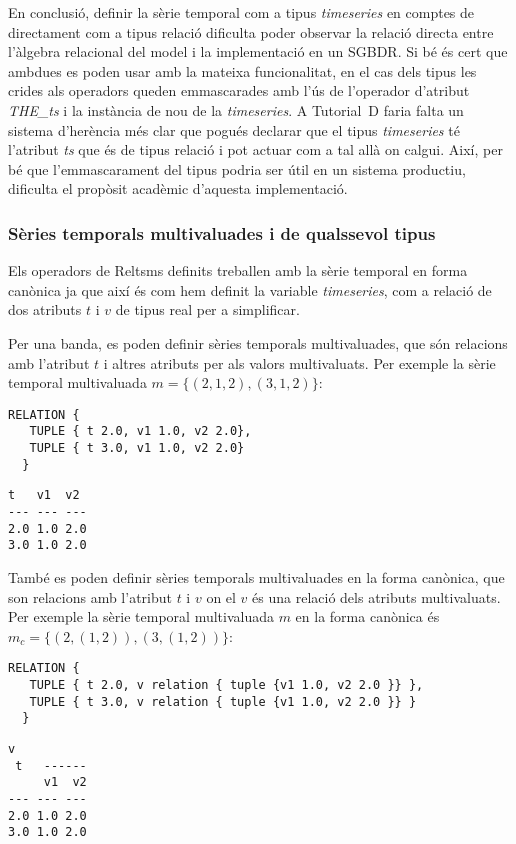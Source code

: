 {En conclusió, definir la sèrie temporal com a tipus \emph{timeseries}
en comptes de directament com a tipus relació dificulta poder observar
la relació directa entre l'àlgebra relacional del model i la
implementació en un \gls{SGBDR}. Si bé és cert que ambdues es poden
usar amb la mateixa funcionalitat, en el cas dels tipus les crides als
operadors queden emmascarades amb l'ús de l'operador d'atribut
\emph{THE\_ts} i la instància de nou de la \emph{timeseries}.  A
Tutorial~D faria falta un sistema d'herència més clar que pogués
declarar que el tipus \emph{timeseries} té l'atribut \emph{ts} que és
de tipus relació i pot actuar com a tal allà on calgui. Així, per bé
que l'emmascarament del tipus podria ser útil en un sistema productiu,
dificulta el propòsit acadèmic d'aquesta implementació.


\subsubsection{Sèries temporals multivaluades i de qualssevol tipus}



Els operadors de Reltsms definits treballen amb la sèrie temporal en
forma canònica ja que així és com hem definit la variable
\emph{timeseries}, com a relació de dos atributs $t$ i $v$ de tipus
real per a simplificar.

Per una banda, es poden definir sèries temporals multivaluades, que
són relacions amb l'atribut $t$ i altres atributs per als valors
multivaluats. Per exemple la sèrie temporal multivaluada $m = \{
(2,1,2),(3,1,2) \}$:
\begin{lstlisting}[style=tutorialD]
 RELATION {
   TUPLE { t 2.0, v1 1.0, v2 2.0},
   TUPLE { t 3.0, v1 1.0, v2 2.0}
  }
\end{lstlisting}
\begin{lstlisting}[style=stdout]
 t   v1  v2
--- --- ---
2.0 1.0 2.0
3.0 1.0 2.0
\end{lstlisting}

També es poden definir sèries temporals multivaluades en la forma
canònica, que son relacions amb l'atribut $t$ i $v$ on el $v$ és una
relació dels atributs multivaluats. Per exemple la sèrie temporal
multivaluada $m$ en la forma canònica és $m_c = \{ (2,(1,2)),(3,(1,2))
\}$:
\begin{lstlisting}[style=tutorialD]
 RELATION {
   TUPLE { t 2.0, v relation { tuple {v1 1.0, v2 2.0 }} },
   TUPLE { t 3.0, v relation { tuple {v1 1.0, v2 2.0 }} }
  }
\end{lstlisting}
\begin{lstlisting}[style=stdout]
        v
 t   ------
     v1  v2
--- --- ---
2.0 1.0 2.0
3.0 1.0 2.0
\end{lstlisting}


}
